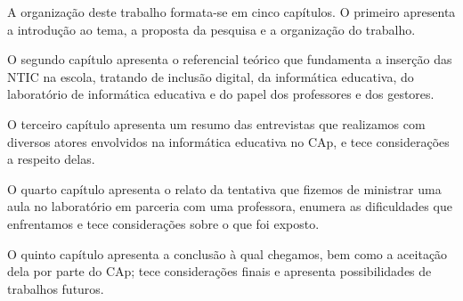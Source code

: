 A organização deste trabalho formata-se em cinco capítulos. O primeiro apresenta a introdução ao tema, a proposta da pesquisa e a organização do trabalho.

O segundo capítulo apresenta o referencial teórico que fundamenta a inserção das NTIC na escola, tratando de inclusão digital, da informática educativa, do laboratório de informática educativa e do papel dos professores e dos gestores.

O terceiro capítulo apresenta um resumo das entrevistas que realizamos com diversos atores envolvidos na informática educativa no CAp, e tece considerações a respeito delas.

O quarto capítulo apresenta o relato da tentativa que fizemos de ministrar uma aula no laboratório em parceria com uma professora, enumera as dificuldades que enfrentamos e tece considerações sobre o que foi exposto.

O quinto capítulo apresenta a conclusão à qual chegamos, bem como a aceitação dela por parte do CAp; tece considerações finais e apresenta possibilidades de trabalhos futuros.
